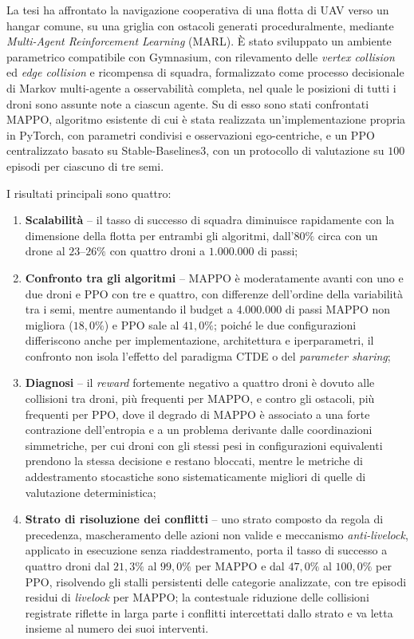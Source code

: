 \documentclass[12pt,a4paper,twoside]{report}
\newcommand{\parencite}[1]{\citep{#1}}
\begin{document}
La tesi ha affrontato la navigazione cooperativa di una flotta di UAV verso un hangar comune, su una griglia con ostacoli generati proceduralmente, mediante \emph{Multi-Agent Reinforcement Learning} (MARL). È stato sviluppato un ambiente parametrico compatibile con Gymnasium, con rilevamento delle \emph{vertex collision} ed \emph{edge collision} e ricompensa di squadra, formalizzato come processo decisionale di Markov multi-agente a osservabilità completa, nel quale le posizioni di tutti i droni sono assunte note a ciascun agente. Su di esso sono stati confrontati MAPPO, algoritmo esistente \parencite{yu2022} di cui è stata realizzata un'implementazione propria in PyTorch, con parametri condivisi e osservazioni ego-centriche, e un PPO centralizzato basato su Stable-Baselines3, con un protocollo di valutazione su $100$ episodi per ciascuno di tre semi.

I risultati principali sono quattro:
\begin{enumerate}
    \item \textbf{Scalabilità} -- il tasso di successo di squadra diminuisce rapidamente con la dimensione della flotta per entrambi gli algoritmi, dall'$80\%$ circa con un drone al $23$--$26\%$ con quattro droni a $1.000.000$ di passi;
    \item \textbf{Confronto tra gli algoritmi} -- MAPPO è moderatamente avanti con uno e due droni e PPO con tre e quattro, con differenze dell'ordine della variabilità tra i semi, mentre aumentando il budget a $4.000.000$ di passi MAPPO non migliora ($18,0\%$) e PPO sale al $41,0\%$; poiché le due configurazioni differiscono anche per implementazione, architettura e iperparametri, il confronto non isola l'effetto del paradigma CTDE o del \emph{parameter sharing};
    \newpage
    \item \textbf{Diagnosi} -- il \emph{reward} fortemente negativo a quattro droni è dovuto alle collisioni tra droni, più frequenti per MAPPO, e contro gli ostacoli, più frequenti per PPO, dove il degrado di MAPPO è associato a una forte contrazione dell'entropia e a un problema derivante dalle coordinazioni simmetriche, per cui droni con gli stessi pesi in configurazioni equivalenti prendono la stessa decisione e restano bloccati, mentre le metriche di addestramento stocastiche sono sistematicamente migliori di quelle di valutazione deterministica;
    \item \textbf{Strato di risoluzione dei conflitti} -- uno strato composto da regola di precedenza, mascheramento delle azioni non valide e meccanismo \emph{anti-livelock}, applicato in esecuzione senza riaddestramento, porta il tasso di successo a quattro droni dal $21,3\%$ al $99,0\%$ per MAPPO e dal $47,0\%$ al $100,0\%$ per PPO, risolvendo gli stalli persistenti delle categorie analizzate, con tre episodi residui di \emph{livelock} per MAPPO; la contestuale riduzione delle collisioni registrate riflette in larga parte i conflitti intercettati dallo strato e va letta insieme al numero dei suoi interventi.
\end{enumerate}
\end{document}
